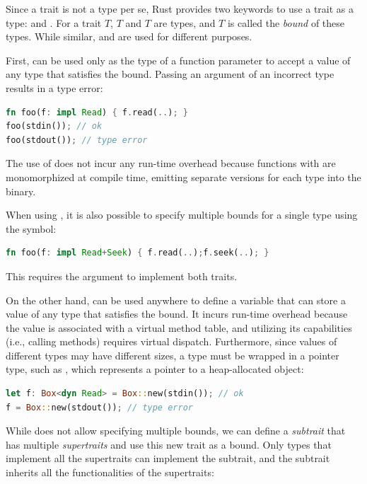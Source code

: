 Since a trait is not a type per se, Rust provides two keywords to use a trait as
a type:  and .
%
For a trait $T$,  $T$ and  $T$ are types, and $T$ is called
the \emph{bound} of these types.
%
While similar,  and  are used for different purposes.

First,  can be used only as the type of a function parameter to accept a
value of any type that satisfies the bound.
%
Passing an argument of an incorrect type results in a type error:

\begin{lstlisting}[language=Rust]
fn foo(f: impl Read) { f.read(..); }
foo(stdin()); // ok
foo(stdout()); // type error
\end{lstlisting}

\noindent
%
The use of  does not incur any run-time overhead because functions with
 are monomorphized at compile time, emitting separate versions for each
type into the binary.

When using , it is also possible to specify multiple bounds for a single
type using the \CT{+} symbol:

\begin{lstlisting}[language=Rust]
fn foo(f: impl Read+Seek) { f.read(..);f.seek(..); }
\end{lstlisting}

\noindent
%
This requires the argument to implement both traits.

On the other hand,  can be used anywhere to define a variable that can
store a value of any type that satisfies the bound.
%
It incurs run-time overhead because the value is associated with a virtual
method table, and utilizing its capabilities (i.e., calling methods) requires
virtual dispatch.
%
Furthermore, since values of different types may have different sizes, a 
type must be wrapped in a pointer type, such as , which represents a
pointer to a heap-allocated object:

\begin{lstlisting}[language=Rust]
let f: Box<dyn Read> = Box::new(stdin()); // ok
f = Box::new(stdout()); // type error
\end{lstlisting}

While  does not allow specifying multiple bounds, we can define a
\emph{subtrait} that has multiple \emph{supertraits} and use this new trait as a
bound.
%
Only types that implement all the supertraits can implement the subtrait, and
the subtrait inherits all the functionalities of the supertraits:

